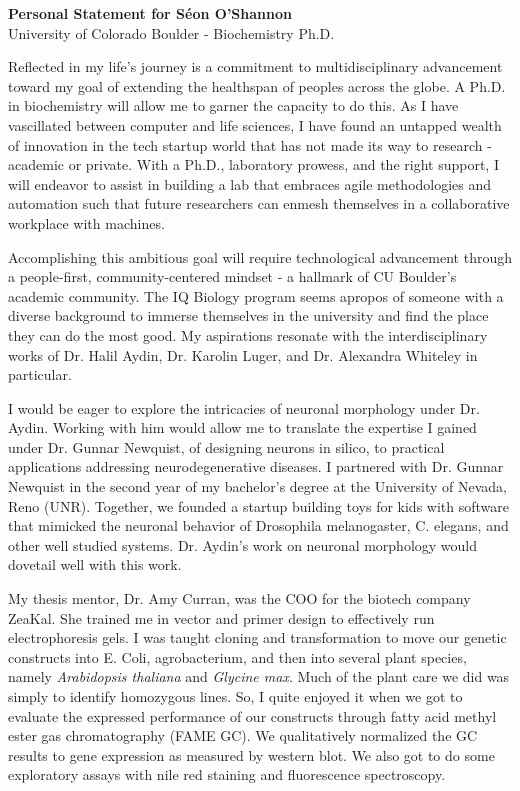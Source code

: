\documentclass[12pt]{article}
\begin{document}
\begin{center}
    \Large{\textbf{Personal Statement for Séon O'Shannon}} \\
    University of Colorado Boulder - Biochemistry Ph.D.
\end{center}

\vspace{0.5cm}

Reflected in my life's journey is a commitment to multidisciplinary advancement toward my goal of extending the healthspan of peoples across the globe. A Ph.D. in biochemistry will allow me to garner the capacity to do this. As I have vascillated between computer and life sciences, I have found an untapped wealth of innovation in the tech startup world that has not made its way to research - academic or private. With a Ph.D., laboratory prowess, and the right support, I will endeavor to assist in building a lab that embraces agile methodologies and automation such that future researchers can enmesh themselves in a collaborative workplace with machines.

Accomplishing this ambitious goal will require technological advancement through a people-first, community-centered mindset - a hallmark of CU Boulder's academic community. The IQ Biology program seems apropos of someone with a diverse background to immerse themselves in the university and find the place they can do the most good. My aspirations resonate with the interdisciplinary works of Dr. Halil Aydin, Dr. Karolin Luger, and Dr. Alexandra Whiteley in particular.

I would be eager to explore the intricacies of neuronal morphology under Dr. Aydin. Working with him would allow me to translate the expertise I gained under Dr. Gunnar Newquist, of designing neurons in silico, to practical applications addressing neurodegenerative diseases. I partnered with Dr. Gunnar Newquist in the second year of my bachelor's degree at the University of Nevada, Reno (UNR). Together, we founded a startup building toys for kids with software that mimicked the neuronal behavior of Drosophila melanogaster, C. elegans, and other well studied systems. Dr. Aydin's work on neuronal morphology would dovetail well with this work.

My thesis mentor, Dr. Amy Curran, was the COO for the biotech company ZeaKal. She trained me in vector and primer design to effectively run electrophoresis gels. I was taught cloning and transformation to move our genetic constructs into E. Coli, agrobacterium, and then into several plant species, namely \textit{Arabidopsis thaliana} and \textit{Glycine max}. Much of the plant care we did was simply to identify homozygous lines. So, I quite enjoyed it when we got to evaluate the expressed performance of our constructs through fatty acid methyl ester gas chromatography (FAME GC). We qualitatively normalized the GC results to gene expression as measured by western blot. We also got to do some exploratory assays with nile red staining and fluorescence spectroscopy.
\end{document}
